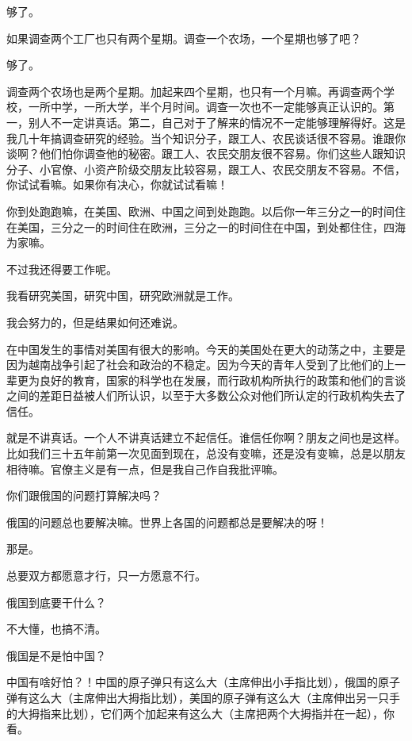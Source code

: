 够了。

如果调查两个工厂也只有两个星期。调查一个农场，一个星期也够了吧？

够了。

调查两个农场也是两个星期。加起来四个星期，也只有一个月嘛。再调查两个学校，一所中学，一所大学，半个月时间。调查一次也不一定能够真正认识的。第一，别人不一定讲真话。第二，自己对于了解来的情况不一定能够理解得好。这是我几十年搞调查研究的经验。当个知识分子，跟工人、农民谈话很不容易。谁跟你谈啊？他们怕你调查他的秘密。跟工人、农民交朋友很不容易。你们这些人跟知识分子、小官僚、小资产阶级交朋友比较容易，跟工人、农民交朋友不容易。不信，你试试看嘛。如果你有决心，你就试试看嘛！

你到处跑跑嘛，在美国、欧洲、中国之间到处跑跑。以后你一年三分之一的时间住在美国，三分之一的时间住在欧洲，三分之一的时间住在中国，到处都住住，四海为家嘛。

不过我还得要工作呢。

我看研究美国，研究中国，研究欧洲就是工作。

我会努力的，但是结果如何还难说。

在中国发生的事情对美国有很大的影响。今天的美国处在更大的动荡之中，主要是因为越南战争引起了社会和政治的不稳定。因为今天的青年人受到了比他们的上一辈更为良好的教育，国家的科学也在发展，而行政机构所执行的政策和他们的言谈之间的差距日益被人们所认识，以至于大多数公众对他们所认定的行政机构失去了信任。

就是不讲真话。一个人不讲真话建立不起信任。谁信任你啊？朋友之间也是这样。比如我们三十五年前第一次见面到现在，总没有变嘛，还是没有变嘛，总是以朋友相待嘛。官僚主义是有一点，但是我自己作自我批评嘛。

你们跟俄国的问题打算解决吗？

俄国的问题总也要解决嘛。世界上各国的问题都总是要解决的呀！

那是。

总要双方都愿意才行，只一方愿意不行。

俄国到底要干什么？

不大懂，也搞不清。

俄国是不是怕中国？

中国有啥好怕？！中国的原子弹只有这么大（主席伸出小手指比划），俄国的原子弹有这么大（主席伸出大拇指比划），美国的原子弹有这么大（主席伸出另一只手的大拇指来比划），它们两个加起来有这么大（主席把两个大拇指并在一起），你看。

